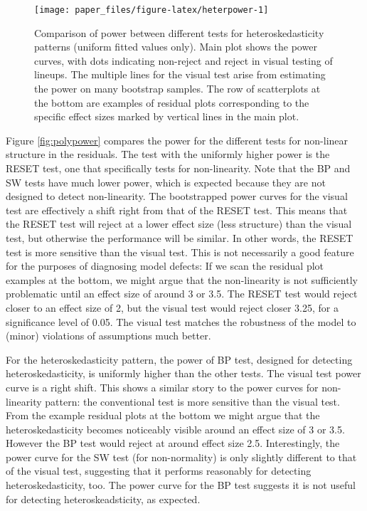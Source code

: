 \documentclass[]{interact}
\theoremstyle{plain}%
\theoremstyle{definition}
\theoremstyle{remark}
\begin{document}
\begin{figure}

{\centering \texttt{[image: paper\_files/figure-latex/heterpower-1]} 

}

\caption{Comparison of power between different tests for heteroskedasticity patterns (uniform fitted values only). Main plot shows the power curves, with dots indicating non-reject and reject in visual testing of lineups. The multiple lines for the visual test arise from estimating the power on many bootstrap samples. The row of scatterplots at the bottom are examples of residual plots corresponding to the specific effect sizes marked by vertical lines in the main plot.}\label{fig:heterpower}
\end{figure}

Figure \ref{fig:polypower} compares the power for the different tests
for non-linear structure in the residuals. The test with the uniformly
higher power is the RESET test, one that specifically tests for
non-linearity. Note that the BP and SW tests have much lower power,
which is expected because they are not designed to detect non-linearity.
The bootstrapped power curves for the visual test are effectively a
shift right from that of the RESET test. This means that the RESET test
will reject at a lower effect size (less structure) than the visual
test, but otherwise the performance will be similar. In other words, the
RESET test is more sensitive than the visual test. This is not
necessarily a good feature for the purposes of diagnosing model defects:
If we scan the residual plot examples at the bottom, we might argue that
the non-linearity is not sufficiently problematic until an effect size
of around 3 or 3.5. The RESET test would reject closer to an effect size
of 2, but the visual test would reject closer 3.25, for a significance
level of 0.05. The visual test matches the robustness of the model to
(minor) violations of assumptions much better.

For the heteroskedasticity pattern, the power of BP test, designed for
detecting heteroskedasticity, is uniformly higher than the other tests.
The visual test power curve is a right shift. This shows a similar story
to the power curves for non-linearity pattern: the conventional test is
more sensitive than the visual test. From the example residual plots at
the bottom we might argue that the heteroskedasticity becomes noticeably
visible around an effect size of 3 or 3.5. However the BP test would
reject at around effect size 2.5. Interestingly, the power curve for the
SW test (for non-normality) is only slightly different to that of the
visual test, suggesting that it performs reasonably for detecting
heteroskedasticity, too. The power curve for the BP test suggests it is
not useful for detecting heteroskeadsticity, as expected.
\end{document}
